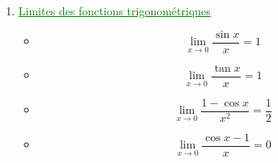\documentclass[12pt]{article}
\begin{document}
\begin{enumerate}[label=\arabic*)]
\begin{enumerate}[label=\alph*)]
\item \textcolor{green}{\underline{Limites des fonctions trigonométriques}}      
       	\begin{itemize}
       	\item \[ \lim_{x \to 0} \frac{\sin x}{x}=1 \]
       	\item \[ \lim_{x \to 0} \frac{\tan x}{x}=1 \]
       	\item \[ \lim_{x \to 0} \frac{1-\cos x}{x^{2}}=\frac{1}{2} \]
       	\item \[ \lim_{x \to 0} \frac{\cos x -1 }{x}=0 \]
       	\end{itemize}
\end{enumerate}
		
		
		
		
		
		
		
		

		

		
		
		
		
		
\end{enumerate}
\end{document}
